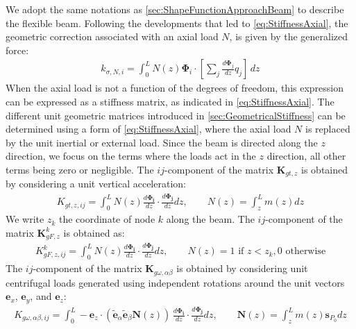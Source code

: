 \documentclass[wes, manuscript]{copernicus}
\renewcommand{\v}[1]{\boldsymbol{#1}}
\newcommand{\m}[1]{\boldsymbol{#1}}
\newcommand{\todoBoth}    [1]{{\colorbox{yellow}{TODO Both:    }}{\color{red}{#1}}\colorbox{yellow}{/}}
\begin{document}
We adopt the same notations as \autoref{sec:ShapeFunctionApproachBeam} to describe the flexible beam.
Following the developments that led to \autoref{eq:StiffnessAxial},
the geometric correction associated with an axial load $N$, is given by the generalized force:
\begin{align}
    k_{\sigma,N,i}=\int_0^L N(z) \v{\Phi}_i\cdot \left[\sum_j\frac{d\v{\Phi}_j}{dz} q_j \right]\, dz
        \label{eq:kSigmaNBeamZ}
\end{align}
When the axial load is not a function of the degrees of freedom, this expression can be expressed as a stiffness matrix, as indicated in \autoref{eq:StiffnessAxial}.
% 
% 
The different unit geometric matrices introduced in \autoref{sec:GeometricalStiffness} can be determined using a form of \autoref{eq:StiffnessAxial}, where the axial load $N$ is replaced by the unit inertial or external load. Since the beam is directed along the $z$ direction, we focus on the terms where the loads act in the $z$ direction, all other terms being zero or negligible.
The $ij$-component of the matrix $\m{K}_{gt,z}$ is obtained by considering a unit vertical acceleration:
\begin{align}
   K_{gt,z,ij} = \int_0^L N(z) \frac{d\v{\Phi_i}}{dz}\cdot\frac{d\v{\Phi_j}}{dz} dz, 
   \qquad
   N(z) = \int_z^L m(z) dz
\end{align}
% 
We write $z_k$ the coordinate of node $k$ along the beam. The $ij$-component of the matrix $\m{K}_{gF,z}^k$ is obtained as:
\begin{align}
   K_{gF,z,ij}^k = \int_0^L N(z) \frac{d\v{\Phi_i}}{dz}\cdot\frac{d\v{\Phi_j}}{dz} dz, 
   \qquad
   N(z) = 1 \text{ if $z<z_k$}, 0 \text{ otherwise} 
\end{align}
The $ij$-component of the matrix $\m{K}_{g\omega,\alpha\beta}$ is obtained by considering unit centrifugal loads generated using independent rotations around the unit vectors $\v{e}_x$, $\v{e}_y$, and $\v{e}_z$:
\begin{align}
   K_{g\omega,\alpha\beta,ij} = \int_0^L -\v{e}_z\cdot\left(\tilde{\v{e}}_\alpha\tilde{\v{e}}_\beta \v{N}(z) \right)
   \, \frac{d\v{\Phi_i}}{dz}\cdot\frac{d\v{\Phi_j}}{dz} dz, 
   \qquad
   \v{N}(z) =  \int_z^L m(z) \v{s}_{P_0} dz
\end{align}
\end{document}
